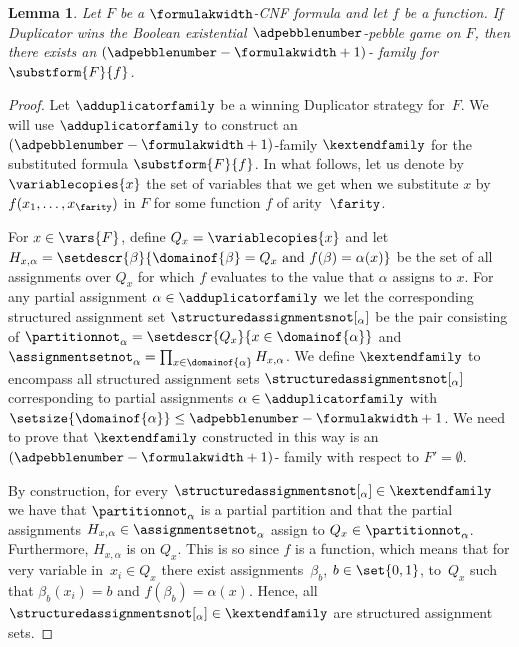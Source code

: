 \documentclass[11pt]{article}
\numberwithin{equation}{section}
\newtheorem{lemma}[theorem]{Lemma}
\theoremstyle{definition}
\theoremstyle{plain}
\begin{document}
\begin{lemma}
  \label{lem:substitution}
  Let $F$ be a $\formulakwidth$-CNF formula and let $f$ be a
  \nonauthor{} function.
%
  If Duplicator wins the
  Boolean existential $\adpebblenumber$-pebble game on $F$, then there
  exists an $(\adpebblenumber - \formulakwidth + 1)$-\kextendibleNok{}
  family for 
%
  $\substform{F}{f}$.
%
%
%
\end{lemma}

\begin{proof}
  Let $\adduplicatorfamily$ be a winning Duplicator strategy for~$F$. 
  We will use 
  $\adduplicatorfamily$
  to construct an 
  $(\adpebblenumber - \formulakwidth + 1)$-\kextendibleNok family 
  $\kextendfamily$ for the substituted formula
  $\substform{F}{f}$. 
  In what follows, let us denote by
  $\variablecopies{x}$ 
  the set of
  variables that we get when we substitute $x$ by 
  $f (x_1, \ldots, x_{\farity})$ in $F$ 
  for some \nonauthor function $f$ of arity~$\farity$.

%
%
%
%
%
%
%
%
%
%
%
%
%
%
%
%
%
%
%
%
%
%
%
%
%
%
%

  For $x \in \vars{F}$,
  define
  $Q_x = \variablecopies{x}$
  and let
  $H_{x,\alpha} = 
  \setdescr{\beta}{\domainof{\beta} = Q_x \text{ and } f(\beta) = \alpha(x)}
%
%
  $
  be the set of all assignments over
  $Q_x$ for which $f$ evaluates to the value that $\alpha$ assigns to $x$.
  For any partial assignment 
  $\alpha \in \adduplicatorfamily$
  we let the corresponding structured assignment set
  $\structuredassignmentsnot[_\alpha]$ be the pair 
  consisting
  of $\partitionnot_\alpha =
  \setdescr{Q_x}{x \in \domainof{\alpha}}$ 
  and 
  $\assignmentsetnot_\alpha = \prod_{x \in \domainof{\alpha}} H_{x,\alpha}$.
  We define $\kextendfamily$ to encompass all
  structured assignment sets 
  $\structuredassignmentsnot[_\alpha]$ 
  corresponding to partial assignments 
  $\alpha \in \adduplicatorfamily$
  with 
  $\setsize{\domainof{\alpha}} \leq \adpebblenumber - \formulakwidth + 1$.
  We need to prove that
  $\kextendfamily$ 
  constructed in this way is an 
  $(\adpebblenumber - \formulakwidth + 1)$-\kextendibleNok 
  family with respect to 
  $F' = \emptyset$. 
  
%
%
%
%
%
%
%
%
%
%
%
%
  By construction, for every
  $\structuredassignmentsnot[_\alpha] \in \kextendfamily$
  we have that 
  $\partitionnot_\alpha$ 
  is a partial partition and that the partial assignments
  $H_{x,\alpha} \in \assignmentsetnot_\alpha$ 
  assign to 
  $Q_x \in \partitionnot_\alpha$.
  Furthermore, 
  $H_{x,\alpha}$ is \flippable on $Q_x$.
  This is so since 
  $f$ is a \nonauthor{} function, which means that 
%
%
  for very variable in~$x_i \in Q_x$
  there exist assignments~$\beta_b$, $b \in \set{0,1}$,
  to~$Q_x$
  such that $\beta_b(x_i) = b$
  and
  $f(\beta_b) = \alpha(x)$.
  Hence, all  
  $\structuredassignmentsnot[_\alpha] \in \kextendfamily$
  are structured assignment sets.



\end{proof}
\end{document}
